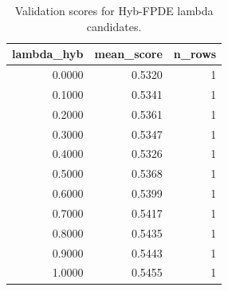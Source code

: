 \begin{table}[t]
\caption{Validation scores for Hyb-FPDE lambda candidates.}
\label{tab:lambda_distribution_computed}
\centering
\begin{tabular}{rrr}
\toprule
lambda\_hyb & mean\_score & n\_rows \\
\midrule
0.0000 & 0.5320 & 1 \\
0.1000 & 0.5341 & 1 \\
0.2000 & 0.5361 & 1 \\
0.3000 & 0.5347 & 1 \\
0.4000 & 0.5326 & 1 \\
0.5000 & 0.5368 & 1 \\
0.6000 & 0.5399 & 1 \\
0.7000 & 0.5417 & 1 \\
0.8000 & 0.5435 & 1 \\
0.9000 & 0.5443 & 1 \\
1.0000 & 0.5455 & 1 \\
\bottomrule
\end{tabular}

\end{table}
